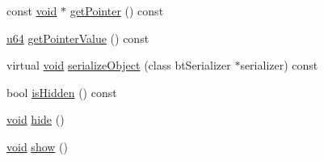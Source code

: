 \begin{DoxyCompactItemize}
\item 
const \mbox{\hyperlink{_thread_8h_af1e856da2e658414cb2456cb6f7ebc66}{void}} $\ast$ \mbox{\hyperlink{classnjli_1_1_slider_h_u_d_ac4ca71716ed832be357f15f8262c8448}{get\+Pointer}} () const
\item 
\mbox{\hyperlink{_util_8h_ad758b7a5c3f18ed79d2fcd23d9f16357}{u64}} \mbox{\hyperlink{classnjli_1_1_slider_h_u_d_a4ffddf141a426a5a07d0ac19f1913811}{get\+Pointer\+Value}} () const
\item 
virtual \mbox{\hyperlink{_thread_8h_af1e856da2e658414cb2456cb6f7ebc66}{void}} \mbox{\hyperlink{classnjli_1_1_slider_h_u_d_a4fc4bcd9d1930911474210c047372fc0}{serialize\+Object}} (class bt\+Serializer $\ast$serializer) const
\item 
bool \mbox{\hyperlink{classnjli_1_1_slider_h_u_d_a3009efb11b4bcd56bd933c21b230a125}{is\+Hidden}} () const
\item 
\mbox{\hyperlink{_thread_8h_af1e856da2e658414cb2456cb6f7ebc66}{void}} \mbox{\hyperlink{classnjli_1_1_slider_h_u_d_a5d7b8b3bc421084f282343e506a6d289}{hide}} ()
\item 
\mbox{\hyperlink{_thread_8h_af1e856da2e658414cb2456cb6f7ebc66}{void}} \mbox{\hyperlink{classnjli_1_1_slider_h_u_d_a73ffd499fceaacd59b518a541ed2133e}{show}} ()
\end{DoxyCompactItemize}
